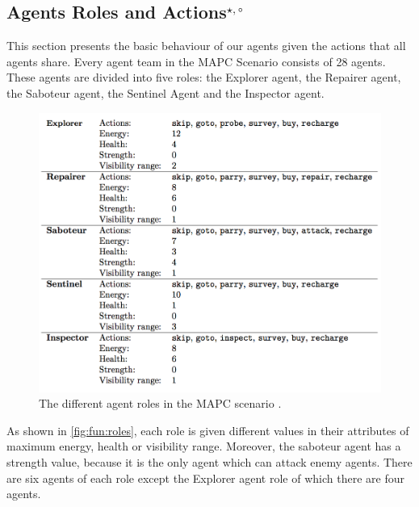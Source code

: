 \subsection[Agent Roles and Actions]{Agents Roles and Actions$^{\star,\circ}$}\label{fun:mapc_roles}
This section presents the basic behaviour of our agents given the actions that all agents share.
Every agent team in the MAPC Scenario consists of 28 agents.
These agents are divided into five roles: the Explorer agent, the Repairer agent, the Saboteur agent, the Sentinel Agent and the Inspector agent.
\begin{figure}[ht]
  \centering
  \includegraphics[width=0.9\linewidth]{images/roles.png}
  \caption{The different agent roles in the MAPC scenario \cite{ahlbrecht_mapc_2014}.}
  \label{fig:fun:roles}
\end{figure}
As shown in \autoref{fig:fun:roles}, each role is given different values in their attributes of maximum energy, health or visibility range.
Moreover, the saboteur agent has a strength value, because it is the only agent which can attack enemy agents.
There are six agents of each role except the Explorer agent role of which there are four agents.
